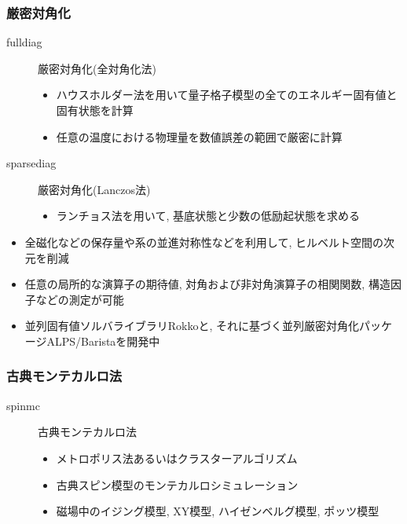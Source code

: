 \begin{frame}
  \frametitle{厳密対角化}
  \begin{description}
  \item[fulldiag] 厳密対角化(全対角化法)
    \begin{itemize}
    \item ハウスホルダー法を用いて量子格子模型の全てのエネルギー固有値と固有状態を計算
    \item 任意の温度における物理量を数値誤差の範囲で厳密に計算
    \end{itemize}
  \item[sparsediag] 厳密対角化(Lanczos法)
    \begin{itemize}
    \item ランチョス法を用いて, 基底状態と少数の低励起状態を求める
    \end{itemize}
  \end{description}
  \begin{itemize}
  \item 全磁化などの保存量や系の並進対称性などを利用して, ヒルベルト空間の次元を削減
  \item 任意の局所的な演算子の期待値, 対角および非対角演算子の相関関数, 構造因子などの測定が可能
  \item 並列固有値ソルバライブラリRokkoと, それに基づく並列厳密対角化パッケージALPS/Baristaを開発中
  \end{itemize}
\end{frame}

\begin{frame}
  \frametitle{古典モンテカルロ法}
  \begin{description}
  \item[spinmc] 古典モンテカルロ法
    \begin{itemize}
      \item メトロポリス法あるいはクラスターアルゴリズム
      \item 古典スピン模型のモンテカルロシミュレーション
      \item 磁場中のイジング模型, XY模型, ハイゼンベルグ模型, ポッツ模型
    \end{itemize}
  \end{description}
\end{frame}

